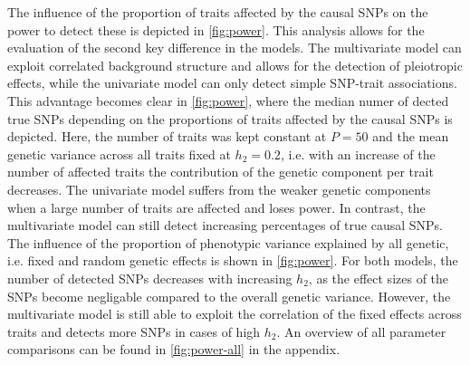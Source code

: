 The influence of the proportion of traits affected by the causal SNPs on the power to detect these is depicted in \cref{fig:power}. This analysis allows for the evaluation of the second key difference in the models. The multivariate model can exploit correlated background structure and allows for the detection of pleiotropic effects, while the univariate model can only detect simple SNP-trait associations. This advantage becomes clear in \cref{fig:power}, where the median numer of dected true SNPs depending on the proportions of traits affected by the causal SNPs is depicted. Here, the number of traits was kept constant at \(P=50\) and the mean genetic variance across all traits fixed at \(h_2=0.2\), i.e. with an increase of the number of affected traits the contribution of the genetic component per trait decreases. The univariate model suffers from the weaker genetic components when a large number of traits are affected and loses power. In contrast, the multivariate model can still detect increasing percentages of true causal SNPs. The influence of the proportion of phenotypic variance explained by all genetic, i.e. fixed and random genetic effects is shown in \cref{fig:power}. For both models, the number of detected SNPs decreases with increasing \(h_2\), as the effect sizes of the SNPs become negligable compared to the overall genetic variance. However, the multivariate model is still able to exploit the correlation of the fixed effects across traits and detects more SNPs in cases of high \(h_2\). An overview of all parameter comparisons can be found in \cref{fig:power-all} in the appendix. 
 